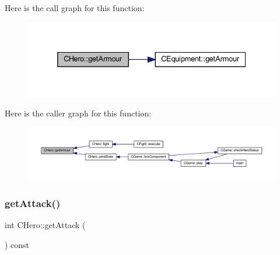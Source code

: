 Here is the call graph for this function\+:\nopagebreak
\begin{figure}[H]
\begin{center}
\leavevmode
\includegraphics[width=332pt]{class_c_hero_a50d1e46ce5b1d84c6ed04493f1d71f81_cgraph}
\end{center}
\end{figure}
Here is the caller graph for this function\+:\nopagebreak
\begin{figure}[H]
\begin{center}
\leavevmode
\includegraphics[width=350pt]{class_c_hero_a50d1e46ce5b1d84c6ed04493f1d71f81_icgraph}
\end{center}
\end{figure}
\mbox{\label{class_c_hero_a1be25c88254db1f753e1ce89da03ef46}} 
\subsubsection{\texorpdfstring{get\+Attack()}{getAttack()}}
{\footnotesize\ttfamily int C\+Hero\+::get\+Attack (\begin{DoxyParamCaption}{ }\end{DoxyParamCaption}) const\hspace{0.3cm}{\ttfamily [inline]}}

